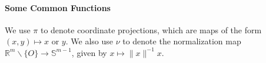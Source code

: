 \paragraph{Some Common Functions}We use $\pi$ to denote coordinate projections, which are maps of the form $(x,y)\mapsto x$ or $y$. We also use $\nu$ to denote the normalization map $\mathbb{R}^{m}\smallsetminus \{O\}\to \mathbb{S}^{m-1}$, given by $x\mapsto \|x\|^{-1}x$.

